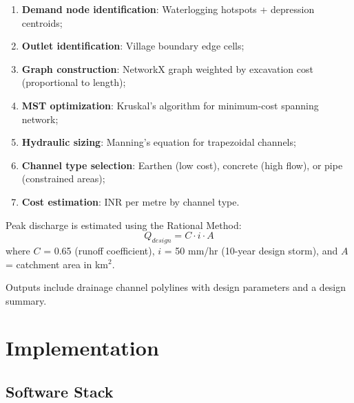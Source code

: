 \documentclass[a4paper,12pt]{article}
\begin{document}
\bigskip

\begin{enumerate}
	\item \textbf{Demand node identification}: Waterlogging hotspots + depression centroids;
	\item \textbf{Outlet identification}: Village boundary edge cells;
	\item \textbf{Graph construction}: NetworkX graph weighted by excavation cost (proportional to length);
	\item \textbf{MST optimization}: Kruskal's algorithm for minimum-cost spanning network;
	\item \textbf{Hydraulic sizing}: Manning's equation for trapezoidal channels;
	\item \textbf{Channel type selection}: Earthen (low cost), concrete (high flow), or pipe (constrained areas);
	\item \textbf{Cost estimation}: INR per metre by channel type.
\end{enumerate}

Peak discharge is estimated using the Rational Method:
\begin{equation}
	Q_{design} = C \cdot i \cdot A
\end{equation}
where $C$ = 0.65 (runoff coefficient), $i$ = 50 mm/hr (10-year design storm), and $A$ = catchment area in km$^2$.

Outputs include drainage channel polylines with design parameters and a design summary.

\newpage

\section{Implementation}

\subsection{Software Stack}
\end{document}
